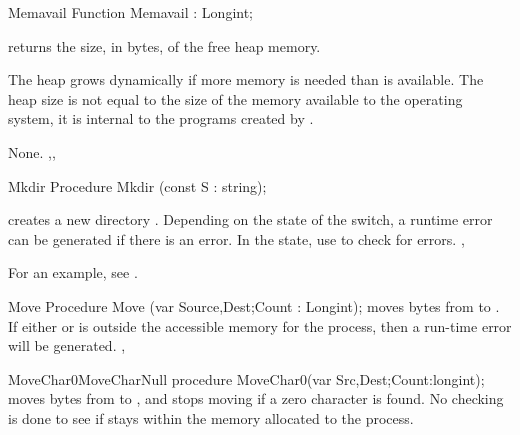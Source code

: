 
\begin{function}{Memavail}
\Declaration
Function Memavail  : Longint;

\Description
{} returns the size, in bytes, of the free heap memory.
\begin{remark}
The heap grows dynamically if more memory is needed than is available. The
heap size is not equal to the size of the memory available to the
operating system, it is internal to the programs created by \fpc.
\end{remark}
\Errors
None.
\SeeAlso
{},, 
\end{function}


\begin{procedure}{Mkdir}
\Declaration
Procedure Mkdir (const S : string);

\Description
{} creates a new  directory .
\Errors
Depending on the state of the  switch, a runtime error can be 
generated if there is an error. In the  state, use 
to check for errors.
\SeeAlso
{}, 
\end{procedure}
For an example, see .
\begin{procedure}{Move}
\Declaration
Procedure Move (var Source,Dest;Count : Longint);
\Description
{} moves  bytes from  to .
\Errors
If either  or  is outside the accessible memory for
the process, then a run-time error will be generated.
\SeeAlso
{}, 
\end{procedure}


\begin{procedurel}{MoveChar0}{MoveCharNull}
\Declaration
procedure MoveChar0(var Src,Dest;Count:longint);
\Description
{} moves  bytes from  to , and
stops moving if a zero character is found.
\Errors
No checking is done to see if  stays within the memory allocated
to the process.
\SeeAlso
{}
\end{procedurel}


